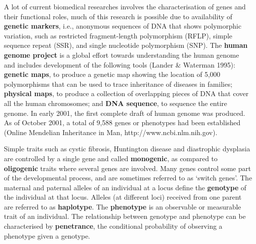 A lot of current biomedical researches involves the characterisation of genes
and their functional roles, much of this research is possible due to
availability of {\bf genetic markers}, i.e., anonymous sequences of DNA that
shows polymorphic variation, such as restricted fragment-length polymorphism
(RFLP), simple sequence repeat (SSR), and single nucleotide polymorphism (SNP).
The {\bf human genome project} is a global effort towards understanding the
human genome and includes development of the following tools (Lander \&
Waterman 1995):  {\bf genetic maps}, to produce a genetic map showing the
location of 5,000 polymorphisms that can be used to trace inheritance of
diseases in families; {\bf physical maps}, to produce a collection of
overlapping pieces of DNA that cover all the human chromosomes; and {\bf DNA
sequence}, to sequence the entire genome.  In early 2001, the first complete
draft of human genome was produced.  As of October 2001, a total of 9,588 genes
or phenotypes had been established (Online Mendelian Inheritance in Man,
http://www.ncbi.nlm.nih.gov).

Simple traits such as cystic fibrosis, Huntington disease and diastrophic
dysplasia are controlled by a single gene and called {\bf monogenic}, as
compared to {\bf oligogenic} traits where several genes are involved.  Many
genes control some part of the developmental process, and are sometimes
referred to as `switch genes'.  The maternal and paternal alleles of an
individual at a locus define the {\bf genotype} of the individual at that
locus.  Alleles (at different loci) received from one parent are referred to as
{\bf haplotype}.  The {\bf phenotype} is an observable or measurable trait of
an individual.  The relationship between genotype and phenotype can be
characterised by {\bf penetrance}, the conditional probability of observing a
phenotype given a genotype.

